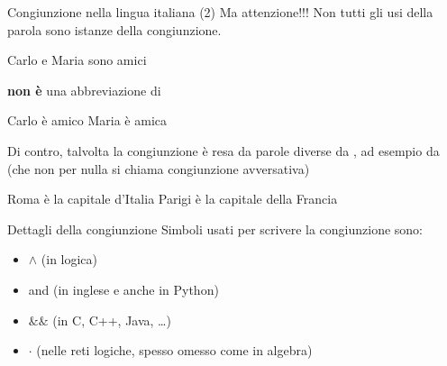 \documentclass[10pt,dvipsnames,handout]{beamer}
\begin{document}
\begin{frame}{Congiunzione nella lingua italiana (2)}
    Ma attenzione!!! Non tutti gli usi della parola  sono istanze della congiunzione.
    \begin{example}
        Carlo e Maria sono amici\medskip

        \pause
        \hspace{2cm} \textbf{non è} una abbreviazione di\medskip

        Carlo è amico  Maria è amica\medskip
    \end{example}

    \pause
    \medskip
    Di contro, talvolta la congiunzione è resa da parole diverse da , ad esempio da  (che non per nulla si chiama \alert{congiunzione avversativa})

    \begin{example}
        Roma è la capitale d'Italia  Parigi è la capitale della Francia
    \end{example}
\end{frame}

\begin{frame}{Dettagli della congiunzione}
    Simboli usati per scrivere la congiunzione sono:
    \begin{itemize}
        \item \alert{$\wedge$ (in logica)}
        \item and (in inglese e anche in Python)
        \item $\texttt{\&\&}$ (in C, C++, Java, \ldots)
        \item $\cdot$ (nelle reti logiche, spesso omesso come in algebra)
    \end{itemize}

\end{frame}
\end{document}
